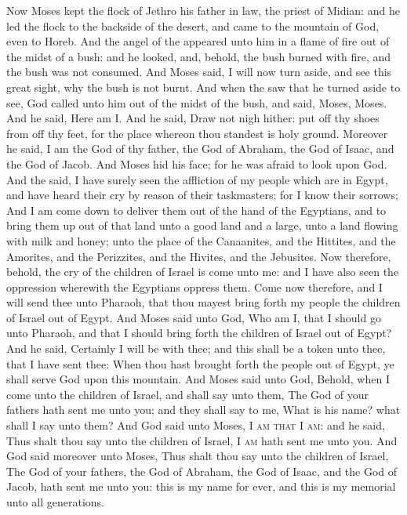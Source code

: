 \begin{biblechapter} %
 Now Moses kept the flock of Jethro his father in law, the priest of Midian: and he led the flock to the backside of the desert, and came to the mountain of God, even to Horeb.
\verse And the angel of the \LORD appeared unto him in a flame of fire out of the midst of a bush: and he looked, and, behold, the bush burned with fire, and the bush was not consumed.
\verse And Moses said, I will now turn aside, and see this great sight, why the bush is not burnt.
\verse And when the \LORD saw that he turned aside to see, God called unto him out of the midst of the bush, and said, Moses, Moses. And he said, Here am I.
\verse And he said, Draw not nigh hither: put off thy shoes from off thy feet, for the place whereon thou standest is holy ground.
\verse Moreover he said, I am the God of thy father, the God of Abraham, the God of Isaac, and the God of Jacob. And Moses hid his face; for he was afraid to look upon God.
\verse And the \LORD said, I have surely seen the affliction of my people which are in Egypt, and have heard their cry by reason of their taskmasters; for I know their sorrows;
\verse And I am come down to deliver them out of the hand of the Egyptians, and to bring them up out of that land unto a good land and a large, unto a land flowing with milk and honey; unto the place of the Canaanites, and the Hittites, and the Amorites, and the Perizzites, and the Hivites, and the Jebusites.
\verse Now therefore, behold, the cry of the children of Israel is come unto me: and I have also seen the oppression wherewith the Egyptians oppress them.
\verse Come now therefore, and I will send thee unto Pharaoh, that thou mayest bring forth my people the children of Israel out of Egypt.
\verse And Moses said unto God, Who am I, that I should go unto Pharaoh, and that I should bring forth the children of Israel out of Egypt?
\verse And he said, Certainly I will be with thee; and this shall be a token unto thee, that I have sent thee: When thou hast brought forth the people out of Egypt, ye shall serve God upon this mountain.
\verse And Moses said unto God, Behold, when I come unto the children of Israel, and shall say unto them, The God of your fathers hath sent me unto you; and they shall say to me, What is his name? what shall I say unto them?
\verse And God said unto Moses, \textsc{I am that I am}: and he said, Thus shalt thou say unto the children of Israel, \textsc{I am} hath sent me unto you.
\verse And God said moreover unto Moses, Thus shalt thou say unto the children of Israel, The \LORD God of your fathers, the God of Abraham, the God of Isaac, and the God of Jacob, hath sent me unto you: this is my name for ever, and this is my memorial unto all generations.

\end{biblechapter}
